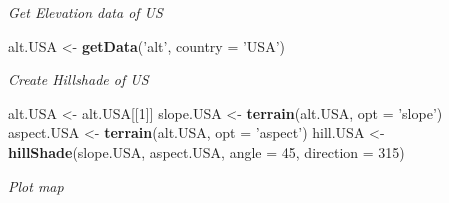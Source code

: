 \documentclass[author-year, review, 11pt]{components/elsarticle} %
\newenvironment{Shaded}{\begin{snugshade}}{\end{snugshade}}
\newcommand{\KeywordTok}[1]{\textcolor[rgb]{0.13,0.29,0.53}{\textbf{{#1}}}}
\newcommand{\DataTypeTok}[1]{\textcolor[rgb]{0.13,0.29,0.53}{{#1}}}
\newcommand{\DecValTok}[1]{\textcolor[rgb]{0.00,0.00,0.81}{{#1}}}
\newcommand{\StringTok}[1]{\textcolor[rgb]{0.31,0.60,0.02}{{#1}}}
\newcommand{\NormalTok}[1]{{#1}}
\begin{document}
\emph{Get Elevation data of US}

\begin{Shaded}
\begin{Highlighting}[]
\NormalTok{alt.USA <-}\StringTok{ }\KeywordTok{getData}\NormalTok{(}\StringTok{'alt'}\NormalTok{, }\DataTypeTok{country =} \StringTok{'USA'}\NormalTok{)}
\end{Highlighting}
\end{Shaded}

\emph{Create Hillshade of US}

\begin{Shaded}
\begin{Highlighting}[]
\NormalTok{alt.USA <-}\StringTok{ }\NormalTok{alt.USA[[}\DecValTok{1}\NormalTok{]]}
\NormalTok{slope.USA <-}\StringTok{ }\KeywordTok{terrain}\NormalTok{(alt.USA, }\DataTypeTok{opt =} \StringTok{'slope'}\NormalTok{)}
\NormalTok{aspect.USA <-}\StringTok{ }\KeywordTok{terrain}\NormalTok{(alt.USA, }\DataTypeTok{opt =} \StringTok{'aspect'}\NormalTok{)}
\NormalTok{hill.USA <-}\StringTok{ }\KeywordTok{hillShade}\NormalTok{(slope.USA, aspect.USA, }\DataTypeTok{angle =} \DecValTok{45}\NormalTok{, }\DataTypeTok{direction =} \DecValTok{315}\NormalTok{)}
\end{Highlighting}
\end{Shaded}

\emph{Plot map}
\end{document}

